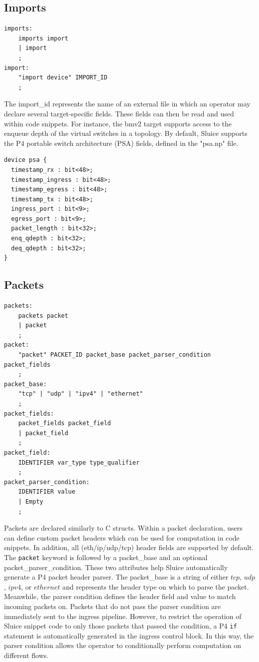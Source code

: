\documentclass[12pt, oneside]{article}
\begin{document}
\subsection{Imports}
\begin{lstlisting}[basicstyle=\linespread{1.3}\scriptsize,  numberstyle=\tiny, backgroundcolor = \color{teagreen}, frame=tlrb]
imports:
	imports import
	| import
	;
import:
	"import device" IMPORT_ID
	;
\end{lstlisting}

The import\_id represents the name of an external file in which an operator may declare several target-specific fields. These fields can then be read and used within code snippets. For instance, the bmv2 target supports access to the enqueue depth of the virtual switches in a topology. By default, Sluice supports the P4 portable switch architecture (PSA) fields, defined in the "psa.np" file. 

\begin{lstlisting}[basicstyle=\linespread{1.3}\scriptsize, caption=PSA fields]
device psa {
  timestamp_rx : bit<48>;
  timestamp_ingress : bit<48>;
  timestamp_egress : bit<48>;
  timestamp_tx : bit<48>;
  ingress_port : bit<9>;
  egress_port : bit<9>;
  packet_length : bit<32>;
  enq_qdepth : bit<32>;
  deq_qdepth : bit<32>;
}
\end{lstlisting}



\subsection{Packets}
\begin{lstlisting}[basicstyle=\linespread{1.3}\scriptsize,  numberstyle=\tiny, backgroundcolor = \color{teagreen}, frame=tlrb]
packets:
	packets packet
	| packet
	;
packet:
	"packet" PACKET_ID packet_base packet_parser_condition packet_fields
	;
packet_base:
	"tcp" | "udp" | "ipv4" | "ethernet"
	;
packet_fields:
	packet_fields packet_field
	| packet_field
	;
packet_field:
	IDENTIFIER var_type type_qualifier
	;
packet_parser_condition:
	IDENTIFIER value
	| Empty
	;
\end{lstlisting}

Packets are declared similarly to C structs. Within a packet declaration, users can define custom packet headers which can be used for computation in code snippets. In addition, all (eth/ip/udp/tcp) header fields are supported by default. The \texttt{packet} keyword is followed by a packet\_base and an optional packet\_parser\_condition. These two attributes help Sluice automatically generate a P4 packet header parser. The packet\_base is a string of either $tcp$, $udp$, $ipv4$, or $ethernet$ and represents the header type on which to parse the packet.  Meanwhile, the parser condition defines the header field and value to match incoming packets on. Packets that do not pass the parser condition are immediately sent to the ingress pipeline. However, to restrict the operation of Sluice snippet code to only those packets that passed the condition, a P4 \texttt{if} statement is automatically generated in the ingress control block. In this way, the parser condition allows the operator to conditionally perform computation on different flows.
\end{document}
